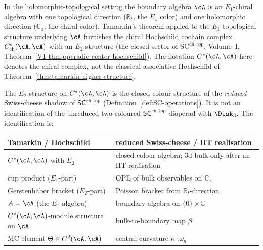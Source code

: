 In the holomorphic-topological setting the boundary algebra
$\cA$ is an $E_1$-chiral algebra with one topological direction
($\mathbb R_t$, the $E_1$ color) and one holomorphic direction
($\mathbb C_z$, the chiral color). Tamarkin's theorem applied
to the $E_1$-topological structure underlying $\cA$ furnishes
the chiral Hochschild cochain complex
$C^*_{\mathrm{ch}}(\cA,\cA)$ with an $E_2$-structure
(the closed sector of $\mathrm{SC}^{\mathrm{ch,top}}$;
Volume~I, Theorem~\ref*{V1-thm:operadic-center-hochschild}).
The notation $C^*(\cA,\cA)$ here denotes the chiral complex,
not the classical associative Hochschild of Theorem~\ref{thm:tamarkin-higher-structure}.

\begin{proposition}
\label{prop:swiss-cheese-from-tamarkin}
The $E_2$-structure on $C^*(\cA,\cA)$ is the closed-colour structure of
the \emph{reduced} Swiss-cheese shadow of
$\mathsf{SC}^{\mathrm{ch,top}}$
\textup{(}Definition~\textup{\ref{def:SC-operations})}. It is not an
identification of the unreduced two-coloured
$\mathsf{SC}^{\mathrm{ch,top}}$ dioperad with $\Disk_3$. The
identification is:
\begin{center}
\renewcommand{\arraystretch}{1.15}
\begin{tabular}{ll}
\textbf{Tamarkin / Hochschild}
 & \textbf{reduced Swiss-cheese / HT realisation} \\
\hline
$C^*(\cA,\cA)$ with $E_2$
 & closed-colour algebra; 3d bulk only after an HT realisation \\
cup product ($E_1$-part)
 & OPE of bulk observables on $\mathbb C_z$ \\
Gerstenhaber bracket ($E_2$-part)
 & Poisson bracket from $\mathbb R_t$-direction \\
$A=\cA$ (the $E_1$-algebra)
 & boundary algebra on $\{0\}\times\mathbb C$ \\
$C^*(\cA,\cA)$-module structure on $\cA$
 & bulk-to-boundary map $\beta$ \\
MC element $\Theta\in C^2(\cA,\cA)$
 & central curvature $\kappa\cdot\omega_g$
\end{tabular}
\end{center}
\end{proposition}

